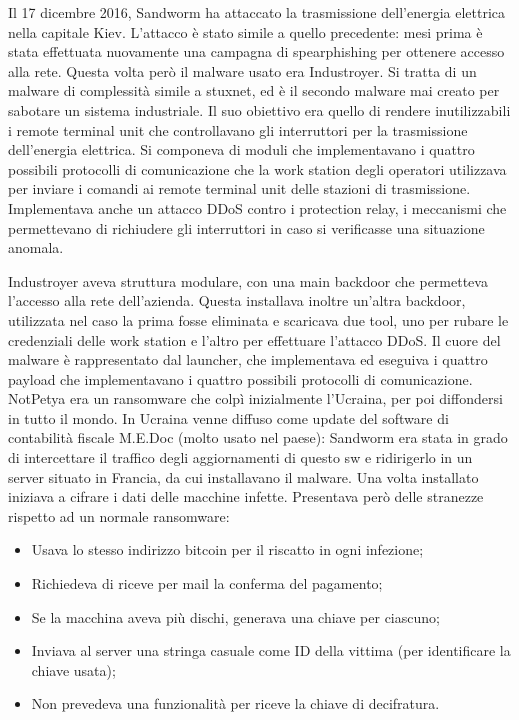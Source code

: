 \noindent  Il 17 dicembre 2016, Sandworm ha attaccato la trasmissione dell'energia elettrica nella capitale Kiev. L'attacco è stato simile a quello precedente: mesi prima è stata effettuata nuovamente una campagna di spearphishing per ottenere accesso alla rete. Questa volta però il malware usato era Industroyer. Si tratta di un malware di complessità simile a stuxnet, ed è il secondo malware mai creato per sabotare un sistema industriale. Il suo obiettivo era quello di rendere inutilizzabili i remote terminal unit che controllavano gli interruttori per la trasmissione dell'energia elettrica. Si componeva di moduli che implementavano i quattro possibili protocolli di comunicazione che la work station degli operatori utilizzava per inviare i comandi ai remote terminal unit delle stazioni di trasmissione. Implementava anche un attacco DDoS contro i protection relay, i meccanismi che permettevano di richiudere gli interruttori in caso si verificasse una situazione anomala. 

 Industroyer aveva struttura modulare, con una main backdoor che permetteva l'accesso alla rete dell'azienda. Questa installava inoltre un'altra backdoor, utilizzata nel caso la prima fosse eliminata e scaricava due tool, uno per rubare le credenziali delle work station e l'altro per effettuare l'attacco DDoS. Il cuore del malware è rappresentato dal launcher, che implementava ed eseguiva i quattro payload che implementavano i quattro possibili protocolli di comunicazione. 
\\

\noindent NotPetya era un ransomware che colpì inizialmente l'Ucraina, per poi diffondersi in tutto il mondo. 
In Ucraina venne diffuso come update del software di contabilità fiscale M.E.Doc (molto usato nel paese): Sandworm era stata in grado di intercettare il traffico degli aggiornamenti di questo sw e ridirigerlo in un server situato in Francia, da cui installavano il malware. Una volta installato iniziava a cifrare i dati delle macchine infette. Presentava però delle stranezze rispetto ad un normale ransomware:
\begin{itemize}
    \item Usava lo stesso indirizzo bitcoin per il riscatto in ogni infezione;
    \item Richiedeva di riceve per mail la conferma del pagamento;
    \item Se la macchina aveva più dischi, generava una chiave per ciascuno;
    \item Inviava al server una stringa casuale come ID della vittima (per identificare la chiave usata);
    \item Non prevedeva una funzionalità per riceve la chiave di decifratura.
\end{itemize}



	
	
	
	
